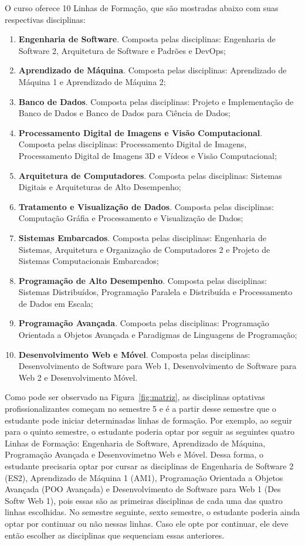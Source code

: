 O curso oferece 10 Linhas de Formação, que são mostradas abaixo com suas respectivas disciplinas:

\begin{enumerate}
\item \textbf{Engenharia de Software}. Composta pelas disciplinas: Engenharia de Software 2, Arquitetura de Software e Padrões e DevOps;
\item \textbf{Aprendizado de Máquina}. Composta pelas disciplinas: Aprendizado de Máquina 1 e Aprendizado de Máquina 2;
\item \textbf{Banco de Dados}. Composta pelas disciplinas: Projeto e Implementação de Banco de Dados e Banco de Dados para Ciência de Dados;
\item \textbf{Processamento Digital de Imagens e Visão Computacional}. Composta pelas disciplinas: Processamento Digital de Imagens, Processamento Digital de Imagens 3D e Vídeos e Visão Computacional;
\item \textbf{Arquitetura de Computadores}. Composta pelas disciplinas: Sistemas Digitais e Arquiteturas de Alto Desempenho; 
\item \textbf{Tratamento e Visualização de Dados}. Composta pelas disciplinas: Computação Gráfia e Processamento e Visualização de Dados;
\item \textbf{Sistemas Embarcados}. Composta pelas disciplinas: Engenharia de Sistemas, Arquitetura e Organização de Computadores 2 e Projeto de Sistemas Computacionais Embarcados; 
\item \textbf{Programação de Alto Desempenho}. Composta pelas disciplinas: Sistemas Distribuídos, Programação Paralela e Distribuída e Processamento de Dados em Escala;
\item \textbf{Programação Avançada}. Composta pelas disciplinas: Programação Orientada a Objetos Avançada e Paradigmas de Linguagens de Programação;
\item \textbf{Desenvolvimento Web e Móvel}. Composta pelas disciplinas: Desenvolvimento de Software para Web 1, Desenvolvimento de Software para Web 2 e Desenvolvimento Móvel.
\end{enumerate}

Como pode ser observado na Figura~\ref{fig:matriz}, as disciplinas optativas profissionalizantes começam no semestre 5 e é a partir desse semestre que o estudante pode iniciar determinadas linhas de formação. Por exemplo, ao seguir para o quinto semestre, o estudante poderia optar por seguir as seguintes quatro Linhas de Formação: Engenharia de Software, Aprendizado de Máquina, Programação Avançada e Desenvovimetno Web e Móvel. Dessa forma, o estudante precisaria optar por cursar as disciplinas de Engenharia de Software 2 (ES2), Aprendizado de Máquina 1 (AM1), Programação Orientada a Objetos Avançada (POO Avançada) e Desenvolvimento de Software para Web 1 (Des Softw Web 1), pois essas são as primeiras disciplinas de cada uma das quatro linhas escolhidas. No semestre seguinte, sexto semestre, o estudante poderia ainda optar por continuar ou não nessas linhas. Caso ele opte por continuar, ele deve então escolher as disciplinas que sequenciam essas anteriores. 

